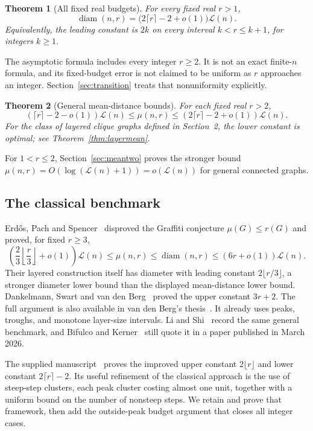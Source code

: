 \documentclass[11pt]{amsart}
\newtheorem{theorem}{Theorem}[section]
\theoremstyle{definition}
\theoremstyle{remark}
\newcommand{\diam}{\operatorname{diam}}
\newcommand{\Lz}{\mathcal{L}}
\begin{document}
\begin{theorem}[All fixed real budgets]\label{thm:main}
For every fixed real $r>1$,
\begin{equation}\label{eq:sharp}
 \diam(n,r)=\bigl(2\lceil r\rceil-2+o(1)\bigr)\Lz(n).
\end{equation}
Equivalently, the leading constant is $2k$ on every interval
$k<r\le k+1$, for integers $k\ge1$.
\end{theorem}

The asymptotic formula includes every integer $r\ge2$. It is not an exact
finite-$n$ formula, and its fixed-budget error is not claimed to be uniform
as $r$ approaches an integer. Section~\ref{sec:transition} treats that
nonuniformity explicitly.

\begin{theorem}[General mean-distance bounds]\label{thm:mean}
For each fixed real $r>2$,
\[
 (\lceil r\rceil-2-o(1))\Lz(n)
 \le\mu(n,r)\le(2\lceil r\rceil-2+o(1))\Lz(n).
\]
For the class of layered clique graphs defined in Section~2, the lower
constant is optimal; see Theorem~\ref{thm:layermean}.
\end{theorem}

For $1<r\le2$, Section~\ref{sec:meantwo} proves the stronger bound
$\mu(n,r)=O(\log(\Lz(n)+1))=o(\Lz(n))$ for general connected graphs.

\subsection*{The classical benchmark}
Erd\H{o}s, Pach and Spencer~\cite{EPS} disproved the Graffiti conjecture
$\mu(G)\le r(G)$ and proved, for fixed $r\ge3$,
\[
 \left(\frac23\left\lfloor\frac r3\right\rfloor+o(1)\right)\Lz(n)
 \le\mu(n,r)\le\diam(n,r)\le(6r+o(1))\Lz(n).
\]
Their layered construction itself has diameter with leading constant
$2\lfloor r/3\rfloor$, a stronger diameter lower bound than the displayed
mean-distance lower bound. Dankelmann, Swart and van den Berg~\cite{DSB}
proved the upper constant $3r+2$. The full argument is also available in
van den Berg's thesis~\cite[Chapter~3, Theorem~5]{VdB}. It already uses peaks,
troughs, and monotone layer-size intervals. Li and Shi~\cite{LS} record the
same general benchmark, and Bifulco and Kerner~\cite[Remark~2]{BK} still
quote it in a paper published in March 2026.

The supplied manuscript~\cite{Supplied} proves the improved upper constant
$2\lfloor r\rfloor$ and lower constant $2\lceil r\rceil-2$. Its useful
refinement of the classical approach is the use of steep-step clusters,
each peak cluster costing almost one unit, together with a uniform bound
on the number of nonsteep steps. We retain and prove that framework, then
add the outside-peak budget argument that closes all integer cases.
\end{document}
